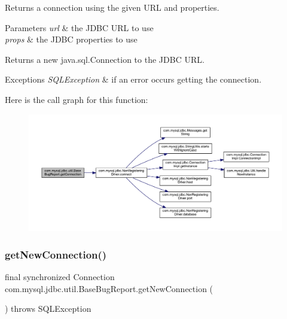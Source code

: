 Returns a connection using the given U\+RL and properties.


\begin{DoxyParams}{Parameters}
{\em url} & the J\+D\+BC U\+RL to use \\
\hline
{\em props} & the J\+D\+BC properties to use \\
\hline
\end{DoxyParams}
\begin{DoxyReturn}{Returns}
a new java.\+sql.\+Connection to the J\+D\+BC U\+RL. 
\end{DoxyReturn}

\begin{DoxyExceptions}{Exceptions}
{\em S\+Q\+L\+Exception} & if an error occurs getting the connection. \\
\hline
\end{DoxyExceptions}
Here is the call graph for this function\+:
\nopagebreak
\begin{figure}[H]
\begin{center}
\leavevmode
\includegraphics[width=350pt]{classcom_1_1mysql_1_1jdbc_1_1util_1_1_base_bug_report_a23d83d1297142eb136a1898cb339b77a_cgraph}
\end{center}
\end{figure}
\mbox{\label{classcom_1_1mysql_1_1jdbc_1_1util_1_1_base_bug_report_a913aef6f4516678c2d67bba169b32fae}} 
\subsubsection{\texorpdfstring{get\+New\+Connection()}{getNewConnection()}}
{\footnotesize\ttfamily final synchronized Connection com.\+mysql.\+jdbc.\+util.\+Base\+Bug\+Report.\+get\+New\+Connection (\begin{DoxyParamCaption}{ }\end{DoxyParamCaption}) throws S\+Q\+L\+Exception}

